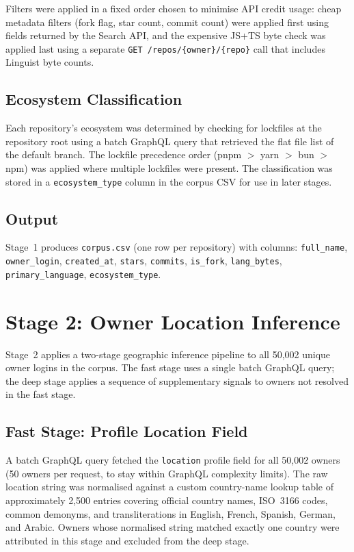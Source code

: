 Filters were applied in a fixed order chosen to minimise API credit usage: cheap metadata filters (fork flag, star count, commit count) were applied first using fields returned by the Search API, and the expensive JS+TS byte check was applied last using a separate \texttt{GET /repos/\{owner\}/\{repo\}} call that includes Linguist byte counts.

\subsection{Ecosystem Classification}

Each repository's ecosystem was determined by checking for lockfiles at the repository root using a batch GraphQL query that retrieved the flat file list of the default branch. The lockfile precedence order (pnpm $>$ yarn $>$ bun $>$ npm) was applied where multiple lockfiles were present. The classification was stored in a \texttt{ecosystem\_type} column in the corpus CSV for use in later stages.

\subsection{Output}

Stage~1 produces \texttt{corpus.csv} (one row per repository) with columns: \texttt{full\_name}, \texttt{owner\_login}, \texttt{created\_at}, \texttt{stars}, \texttt{commits}, \texttt{is\_fork}, \texttt{lang\_bytes}, \texttt{primary\_language}, \texttt{ecosystem\_type}.

\section{Stage 2: Owner Location Inference}
\label{sec:impl:geography}

Stage~2 applies a two-stage geographic inference pipeline to all 50,002 unique owner logins in the corpus. The fast stage uses a single batch GraphQL query; the deep stage applies a sequence of supplementary signals to owners not resolved in the fast stage.

\subsection{Fast Stage: Profile Location Field}

A batch GraphQL query fetched the \texttt{location} profile field for all 50,002 owners (50 owners per request, to stay within GraphQL complexity limits). The raw location string was normalised against a custom country-name lookup table of approximately 2,500 entries covering official country names, ISO~3166 codes, common demonyms, and transliterations in English, French, Spanish, German, and Arabic. Owners whose normalised string matched exactly one country were attributed in this stage and excluded from the deep stage.

